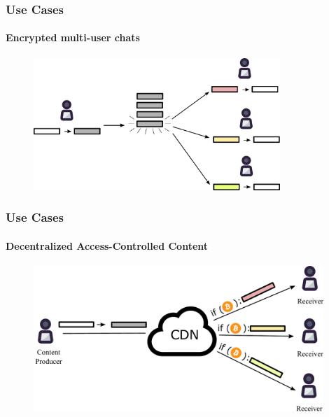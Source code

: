 \documentclass[xetex,mathsans,sans]{beamer}
\begin{document}
    \begin{frame}
        \frametitle{Use Cases}
        \framesubtitle{Encrypted multi-user chats}
        \begin{figure}
            \centering
            \includegraphics[height=5cm]{pdf/chats.pdf}
        \end{figure}
    \end{frame}

    \begin{frame}
        \frametitle{Use Cases}
        \framesubtitle{Decentralized Access-Controlled Content}
        \begin{figure}
            \centering
            \includegraphics[height=5.5cm]{pdf/content.pdf}
        \end{figure}
    \end{frame}
\end{document}
